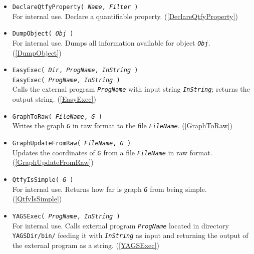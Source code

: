 \documentclass[a4paper,11pt]{report}
\begin{document}
{{\begin{itemize}
\item \texttt{DeclareQtfyProperty( \mbox{\texttt{\mdseries\slshape Name}}, \mbox{\texttt{\mdseries\slshape Filter}} )}\\
 For internal use. Declare a quantifiable property. (\ref{DeclareQtfyProperty}) 
\item \texttt{DumpObject( \mbox{\texttt{\mdseries\slshape Obj}} )}\\
 For internal use. Dumps all information available for object \mbox{\texttt{\mdseries\slshape Obj}}. (\ref{DumpObject}) 
\item \texttt{EasyExec( \mbox{\texttt{\mdseries\slshape Dir}}, \mbox{\texttt{\mdseries\slshape ProgName}}, \mbox{\texttt{\mdseries\slshape InString}} )}\\
 \texttt{EasyExec( \mbox{\texttt{\mdseries\slshape ProgName}}, \mbox{\texttt{\mdseries\slshape InString}} )}\\
 Calls the external program \mbox{\texttt{\mdseries\slshape ProgName}} with input string \mbox{\texttt{\mdseries\slshape InString}}; returns the output string. (\ref{EasyExec}) 
\item \texttt{GraphToRaw( \mbox{\texttt{\mdseries\slshape FileName}}, \mbox{\texttt{\mdseries\slshape G}} )}\\
 Writes the graph \mbox{\texttt{\mdseries\slshape G}} in raw format to the file \mbox{\texttt{\mdseries\slshape FileName}}. (\ref{GraphToRaw}) 
\item \texttt{GraphUpdateFromRaw( \mbox{\texttt{\mdseries\slshape FileName}}, \mbox{\texttt{\mdseries\slshape G}} )}\\
 Updates the coordinates of \mbox{\texttt{\mdseries\slshape G}} from a file \mbox{\texttt{\mdseries\slshape FileName}} in raw format. (\ref{GraphUpdateFromRaw}) 
\item \texttt{QtfyIsSimple( \mbox{\texttt{\mdseries\slshape G}} )}\\
 For internal use. Returns how far is graph \mbox{\texttt{\mdseries\slshape G}} from being simple. (\ref{QtfyIsSimple}) 
\item \texttt{YAGSExec( \mbox{\texttt{\mdseries\slshape ProgName}}, \mbox{\texttt{\mdseries\slshape InString}} )}\\
 For internal use. Calls external program \mbox{\texttt{\mdseries\slshape ProgName}} located in directory \texttt{YAGSDir/bin/} feeding it with \mbox{\texttt{\mdseries\slshape InString}} as input and returning the output of the external program as a string. (\ref{YAGSExec}) 
\end{itemize}
 }

 }
\end{document}
